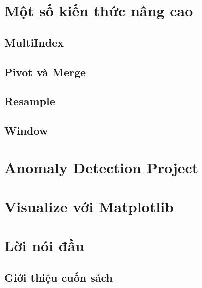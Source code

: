 \documentclass[
]{book}
\begin{document}
\hypertarget{mux1ed9t-sux1ed1-kiux1ebfn-thux1ee9c-nuxe2ng-cao}{%
\chapter{Một số kiến thức nâng cao}\label{mux1ed9t-sux1ed1-kiux1ebfn-thux1ee9c-nuxe2ng-cao}}

\hypertarget{multiindex}{%
\section{MultiIndex}\label{multiindex}}

\hypertarget{pivot-vuxe0-merge}{%
\section{Pivot và Merge}\label{pivot-vuxe0-merge}}

\hypertarget{resample}{%
\section{Resample}\label{resample}}

\hypertarget{window}{%
\section{Window}\label{window}}

\hypertarget{anomaly-detection-project}{%
\chapter{Anomaly Detection Project}\label{anomaly-detection-project}}

\hypertarget{visualize-vux1edbi-matplotlib}{%
\chapter{Visualize với Matplotlib}\label{visualize-vux1edbi-matplotlib}}

\hypertarget{lux1eddi-nuxf3i-ux111ux1ea7u}{%
\chapter*{Lời nói đầu}\label{lux1eddi-nuxf3i-ux111ux1ea7u}}

\hypertarget{giux1edbi-thiux1ec7u-cuux1ed1n-suxe1ch}{%
\section*{Giới thiệu cuốn sách}\label{giux1edbi-thiux1ec7u-cuux1ed1n-suxe1ch}}
\end{document}
